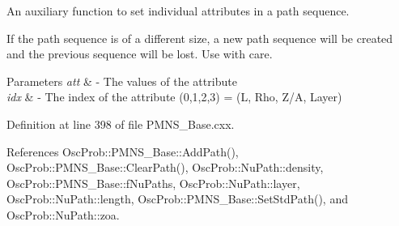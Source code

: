An auxiliary function to set individual attributes in a path sequence.

If the path sequence is of a different size, a new path sequence will be created and the previous sequence will be lost. Use with care.


\begin{DoxyParams}{Parameters}
{\em att} & -\/ The values of the attribute \\
\hline
{\em idx} & -\/ The index of the attribute (0,1,2,3) = (L, Rho, Z/A, Layer) \\
\hline
\end{DoxyParams}


Definition at line 398 of file P\+M\+N\+S\+\_\+\+Base.\+cxx.



References Osc\+Prob\+::\+P\+M\+N\+S\+\_\+\+Base\+::\+Add\+Path(), Osc\+Prob\+::\+P\+M\+N\+S\+\_\+\+Base\+::\+Clear\+Path(), Osc\+Prob\+::\+Nu\+Path\+::density, Osc\+Prob\+::\+P\+M\+N\+S\+\_\+\+Base\+::f\+Nu\+Paths, Osc\+Prob\+::\+Nu\+Path\+::layer, Osc\+Prob\+::\+Nu\+Path\+::length, Osc\+Prob\+::\+P\+M\+N\+S\+\_\+\+Base\+::\+Set\+Std\+Path(), and Osc\+Prob\+::\+Nu\+Path\+::zoa.


